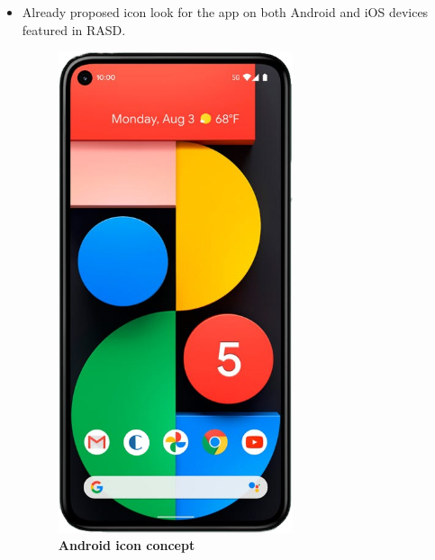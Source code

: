 \captionsetup{justification=centering}
\begin{itemize}
\item Already proposed icon look for the app on both Android and iOS devices featured in RASD.
\begin{figure}[!htb]
\centering
\begin{minipage}{0.4\textwidth}
\centering
\includegraphics[width=0.65\textwidth]{Images/App/Android_AppIcon}
\caption{\label{fig:androidappicon}\textbf{Android icon concept}}
\end{minipage}
\begin{minipage}{0.4\textwidth}
\centering

\end{minipage}
\end{figure}
\end{itemize}
